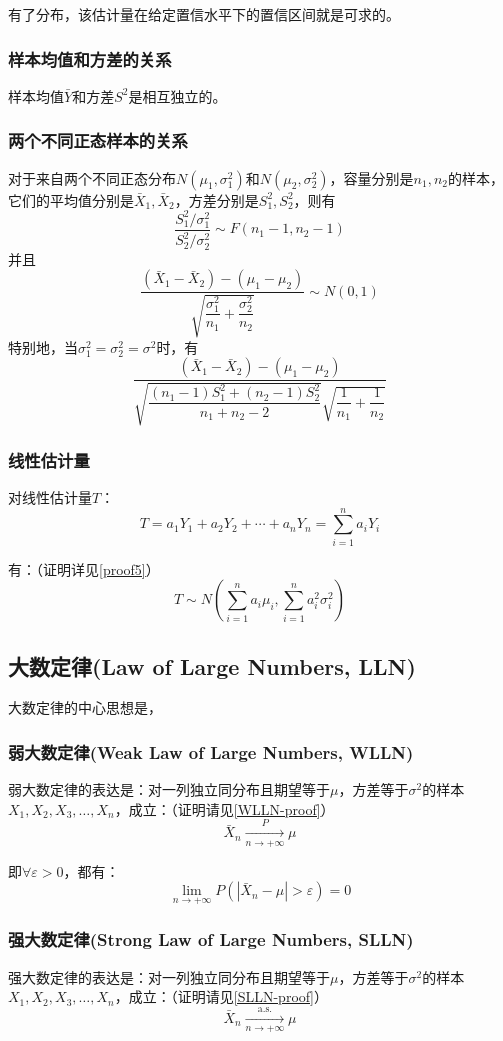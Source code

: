 \documentclass[UTF8]{ctexbook}
\begin{document}
有了分布，该估计量在给定置信水平下的置信区间就是可求的。
\subsubsection{样本均值和方差的关系}
样本均值$\bar{Y}$和方差$S^2$是相互独立的。
\subsubsection{两个不同正态样本的关系}
对于来自两个不同正态分布$N(\mu_1,\sigma_1^2)$和$N(\mu_2,\sigma_2^2)$，容量分别是$n_1,n_2$的样本，它们的平均值分别是$\bar{X}_1,\bar{X}_2$，方差分别是$S^2_1,S^2_2$，则有
\[
	\frac{S^2_1/\sigma_1^2}{S^2_2/\sigma_2^2}\sim F(n_1-1,n_2-1)
\]
并且
\[
	\frac{(\bar{X}_1-\bar{X}_2)-(\mu_1-\mu_2)}{\sqrt{\dfrac{\sigma_1^2}{n_1}+\dfrac{\sigma_2^2}{n_2}}}\sim N(0,1)
\]
特别地，当$\sigma_1^2=\sigma_2^2=\sigma^2$时，有
\[
	\frac{(\bar{X}_1-\bar{X}_2)-(\mu_1-\mu_2)}{\sqrt{\dfrac{(n_1-1)S_1^2+(n_2-1)S_2^2}{n_1+n_2-2}}\sqrt{\dfrac{1}{n_1}+\dfrac{1}{n_2}}}
\]
\subsubsection{线性估计量}
对线性估计量$T$：
\[
	T=a_1Y_1+a_2Y_2+\cdots+a_nY_n=\sum_{i=1}^na_iY_i
\]

有：（证明详见\ref{proof5}）
\[
	T\sim N\left(\sum_{i=1}^na_i\mu_i,\sum_{i=1}^na_i^2\sigma_i^2\right)
\]
\subsection{大数定律(Law of Large Numbers, LLN)}
大数定律的中心思想是，
\subsubsection{弱大数定律(Weak Law of Large Numbers, WLLN)}
\label{WLLN}
弱大数定律的表达是：对一列独立同分布且期望等于$\mu$，方差等于$\sigma^2$的样本$X_1,X_2,X_3,\dots,X_n$，成立：（证明请见\ref{WLLN-proof}）
\[
	\bar{X}_n\xrightarrow[n\to+\infty]{P}\mu
\]

即$\forall\varepsilon>0$，都有：
\[
	\lim_{n\to+\infty}P(|\bar{X}_n-\mu|>\varepsilon)=0
\]

\subsubsection{强大数定律(Strong Law of Large Numbers, SLLN)}
\label{SLLN}
强大数定律的表达是：对一列独立同分布且期望等于$\mu$，方差等于$\sigma^2$的样本$X_1,X_2,X_3,\dots,X_n$，成立：（证明请见\ref{SLLN-proof}）
\[
	\bar{X}_n\xrightarrow[n\to+\infty]{\mathrm{a.s.}}\mu
\]
\end{document}
